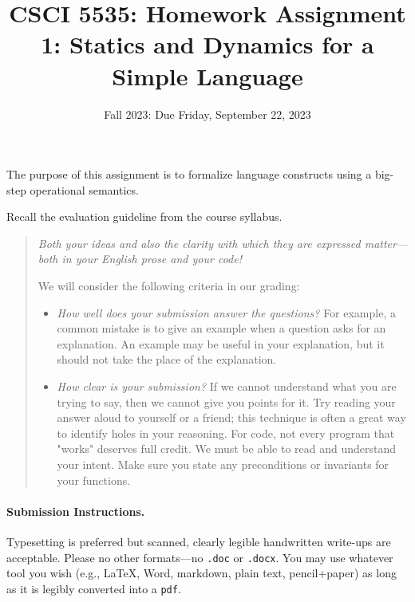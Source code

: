 \documentclass[12pt]{exam}
\title{CSCI 5535: Homework Assignment 1: Statics and Dynamics for a Simple Language}
\date{Fall 2023: Due Friday, September 22, 2023}
\author{}
\begin{document}
\maketitle

The purpose of this assignment is to formalize language constructs
using a big-step operational semantics.

Recall the evaluation guideline from the course syllabus.
\begin{quote}\em
  Both your ideas and also the clarity with which they are expressed
  matter---both in your English prose and your code!

  We will consider the following criteria in our grading: 
  \begin{itemize}
    \item \emph{How well does your submission answer the questions?}
      For example, a common mistake is to give an example when a question
      asks for an explanation.  An example may be useful in your
      explanation, but it should not take the place of the explanation.
    \item \emph{How clear is your submission?}  If we cannot
      understand what you are trying to say, then we cannot give you
      points for it.  Try reading your answer aloud to yourself or a
      friend; this technique is often a great way to identify holes in
      your reasoning.  For code, not every program that "works"
      deserves full credit. We must be able to read and understand
      your intent.  Make sure you state any preconditions or
      invariants for your functions.
  \end{itemize}
\end{quote}

\paragraph{Submission Instructions.}

Typesetting is preferred but scanned, clearly legible handwritten write-ups are acceptable. Please no other formats---no
\texttt{.doc} or \texttt{.docx}. You may use whatever tool you wish (e.g., \LaTeX, Word, markdown, plain text, pencil+paper) as long as it is legibly
converted into a \texttt{pdf}.
\end{document}
